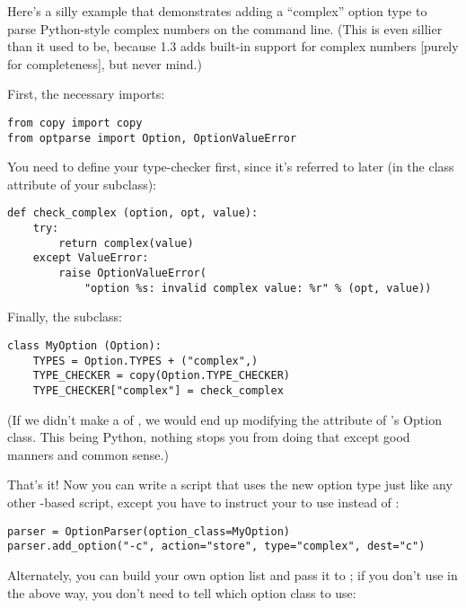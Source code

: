 Here's a silly example that demonstrates adding a ``complex'' option
type to parse Python-style complex numbers on the command line.  (This
is even sillier than it used to be, because  1.3 adds
built-in support for complex numbers [purely for completeness], but
never mind.)

First, the necessary imports:

\begin{verbatim}
from copy import copy
from optparse import Option, OptionValueError
\end{verbatim}

You need to define your type-checker first, since it's referred to
later (in the  class attribute of your
 subclass):

\begin{verbatim}
def check_complex (option, opt, value):
    try:
        return complex(value)
    except ValueError:
        raise OptionValueError(
            "option %s: invalid complex value: %r" % (opt, value))
\end{verbatim}

Finally, the  subclass:

\begin{verbatim}
class MyOption (Option):
    TYPES = Option.TYPES + ("complex",)
    TYPE_CHECKER = copy(Option.TYPE_CHECKER)
    TYPE_CHECKER["complex"] = check_complex
\end{verbatim}

(If we didn't make a  of
, we would end up modifying the
 attribute of 's Option class.
This being Python, nothing stops you from doing that except good
manners and common sense.)

That's it!  Now you can write a script that uses the new option type
just like any other -based script, except you have to
instruct your  to use  instead of
:

\begin{verbatim}
parser = OptionParser(option_class=MyOption)
parser.add_option("-c", action="store", type="complex", dest="c")
\end{verbatim}

Alternately, you can build your own option list and pass it to
; if you don't use  in the
above way, you don't need to tell  which option
class to use:

